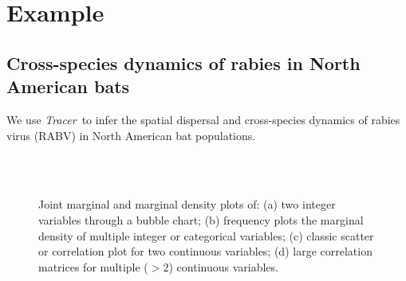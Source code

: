 \documentclass{bioinfo_tracer}
\newcommand{\tracer}{\emph{Tracer}}
\begin{document}
\section*{Example}

\subsection*{Cross-species dynamics of rabies in North American bats}

We use \tracer\ to infer the spatial dispersal and cross-species dynamics of rabies virus (RABV) in North American bat populations.
%
\begin{figure}[t]
 \\
 \\
\caption{Joint marginal and marginal density plots of: (a) two integer variables through a bubble chart; (b) frequency plots the marginal density of multiple integer or categorical variables; (c) classic scatter or correlation plot for two continuous variables; (d) large correlation matrices for multiple ($> 2$) continuous variables.
}
\label{fig:4tabs}
\end{figure}
\end{document}

